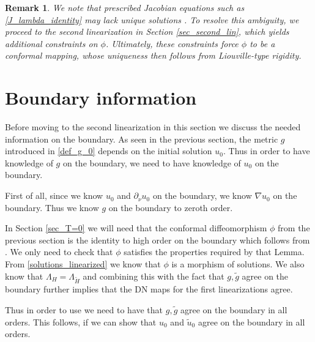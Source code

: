 \documentclass[a4paper, 10pt, twoside, notitlepage]{amsart}
\theoremstyle{plain}
\newtheorem{rmk}[prop]{Remark}
\numberwithin{equation}{section}
\newcommand {\p} {\partial}
\begin{document}
\begin{rmk}

We note that prescribed Jacobian equations such as \eqref{J_lambda_identity} may lack unique solutions \cite[Section 1.4]{csato2011pullback}. To resolve this ambiguity, we proceed to the second linearization in Section \ref{sec_second_lin}, which yields additional constraints on $\phi$. Ultimately, these constraints force $\phi$ to be a conformal mapping, whose uniqueness then follows from Liouville-type rigidity.

\end{rmk}


\section{Boundary information}\label{sec_boundary}

Before moving to the second linearization in this section we discuss the needed information on the boundary. As seen in the previous section, the metric $g$ introduced in \eqref{def_g_0} depends on the initial solution $u_0$. Thus in order to have knowledge of $g$ on the boundary, we need to have knowledge of $u_0$ on the boundary.

First of all, since we know $u_0$ and $\p_{\nu}u_0$ on the boundary, we know $\nabla u_0$ on the boundary. Thus we know $g$ on the boundary to zeroth order.

In Section \ref{sec_T=0} we will need that the conformal diffeomorphism $\phi$ from the previous section is the identity to high order on the boundary which follows from \cite[Lemma 5.1]{carstea2023inverseproblemgeneralminimal}. We only need to check that $\phi$ satisfies the properties required by that Lemma. From \eqref{solutions_linearized} we know that $\phi$ is a morphism of solutions. We also know that $\Lambda_H = \Lambda_{\tilde H}$ and combining this with the fact that $g, \tilde{g}$ agree on the boundary further implies that the DN maps for the first linearizations agree.

Thus in order to use \cite[Lemma 5.1]{carstea2023inverseproblemgeneralminimal} we need to have that $g, \tilde g$ agree on the boundary in all orders. This follows, if we can show that $u_0$ and $\tilde u_0$ agree on the boundary in all orders.
\end{document}
